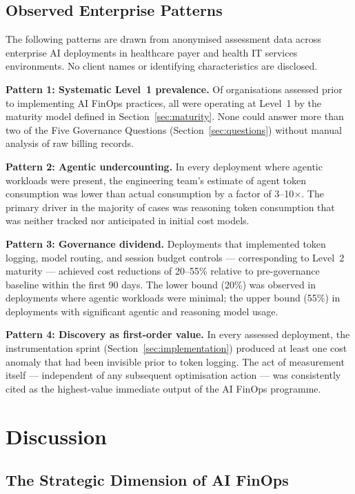 \documentclass[11pt,twocolumn]{article}
\begin{document}
\subsection{Observed Enterprise Patterns}

The following patterns are drawn from anonymised assessment data across enterprise
AI deployments in healthcare payer and health IT services environments. No client
names or identifying characteristics are disclosed.

\textbf{Pattern 1: Systematic Level~1 prevalence.} Of organisations assessed
prior to implementing AI FinOps practices, all were operating at Level~1 by the
maturity model defined in Section~\ref{sec:maturity}. None could answer more than
two of the Five Governance Questions (Section~\ref{sec:questions}) without
manual analysis of raw billing records.

\textbf{Pattern 2: Agentic undercounting.} In every deployment where agentic
workloads were present, the engineering team's estimate of agent token consumption
was lower than actual consumption by a factor of 3--10$\times$. The primary
driver in the majority of cases was reasoning token consumption that was neither
tracked nor anticipated in initial cost models.

\textbf{Pattern 3: Governance dividend.} Deployments that implemented token
logging, model routing, and session budget controls --- corresponding to
Level~2 maturity --- achieved cost reductions of 20--55\% relative to
pre-governance baseline within the first 90 days. The lower bound (20\%) was
observed in deployments where agentic workloads were minimal; the upper bound
(55\%) in deployments with significant agentic and reasoning model usage.

\textbf{Pattern 4: Discovery as first-order value.} In every assessed deployment,
the instrumentation sprint (Section~\ref{sec:implementation}) produced at least
one cost anomaly that had been invisible prior to token logging. The act of
measurement itself --- independent of any subsequent optimisation action --- was
consistently cited as the highest-value immediate output of the AI FinOps programme.

\section{Discussion}
\label{sec:discussion}

\subsection{The Strategic Dimension of AI FinOps}
\end{document}
